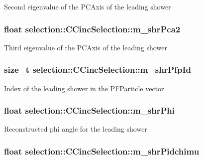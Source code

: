Second eigenvalue of the P\-C\-Axis of the leading shower \hypertarget{classselection_1_1CCincSelection_af63f02140b4cd41dc4e78cd57739c07a}{
\subsubsection[{m\-\_\-shr\-Pca2}]{\setlength{\rightskip}{0pt plus 5cm}float selection\-::\-C\-Cinc\-Selection\-::m\-\_\-shr\-Pca2\hspace{0.3cm}{\ttfamily [private]}}}\label{classselection_1_1CCincSelection_af63f02140b4cd41dc4e78cd57739c07a}
Third eigenvalue of the P\-C\-Axis of the leading shower \hypertarget{classselection_1_1CCincSelection_ad792c1259135d226df875d1150776ce9}{
\subsubsection[{m\-\_\-shr\-Pfp\-Id}]{\setlength{\rightskip}{0pt plus 5cm}size\-\_\-t selection\-::\-C\-Cinc\-Selection\-::m\-\_\-shr\-Pfp\-Id\hspace{0.3cm}{\ttfamily [private]}}}\label{classselection_1_1CCincSelection_ad792c1259135d226df875d1150776ce9}
Index of the leading shower in the P\-F\-Particle vector \hypertarget{classselection_1_1CCincSelection_ac71dc01edcb5f8f636c802755f4cfb14}{
\subsubsection[{m\-\_\-shr\-Phi}]{\setlength{\rightskip}{0pt plus 5cm}float selection\-::\-C\-Cinc\-Selection\-::m\-\_\-shr\-Phi\hspace{0.3cm}{\ttfamily [private]}}}\label{classselection_1_1CCincSelection_ac71dc01edcb5f8f636c802755f4cfb14}
Reconstructed phi angle for the leading shower \hypertarget{classselection_1_1CCincSelection_a01f6b4b35c15cf072e082eee58665bd0}{
\subsubsection[{m\-\_\-shr\-Pidchimu}]{\setlength{\rightskip}{0pt plus 5cm}float selection\-::\-C\-Cinc\-Selection\-::m\-\_\-shr\-Pidchimu\hspace{0.3cm}{\ttfamily [private]}}}\label{classselection_1_1CCincSelection_a01f6b4b35c15cf072e082eee58665bd0}

